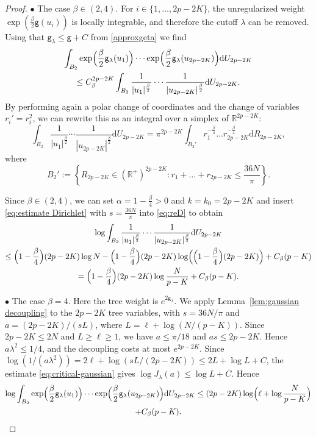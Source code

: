 \documentclass[a4paper,10pt,leqno]{amsart}
\numberwithin{equation}{section}
\newcommand{\R}{\mathbb{R}}
\newcommand{\dd}{\mathrm{d}}
\def\g{\mathsf{g}}
\begin{document}
\begin{proof}
  $\bullet$ The case $\beta\in (2,4)$. For $i\in \{1,\ldots,2p-2K\}$, the unregularized weight $\exp(\frac{\beta}{2}\g(u_i))$ is locally integrable, and therefore the cutoff $\lambda$ can be removed. Using that $\g_\lambda\leq \g+C$ from \eqref{approxgeta} we find
  \begin{multline*}
    \int_{B_2}\exp\Bigl(\frac{\beta}{2}\g_\lambda(u_1)\Bigr)\cdots \exp\Bigl(\frac{\beta}{2}\g_\lambda(u_{2p-2K})\Bigr)\dd U_{2p-2K}\\ \leq C_\beta^{2p-2K}\int_{B_2}\frac{1}{|u_1|^{\frac{\beta}{2}}}\cdots \frac{1}{|u_{2p-2K}|^{\frac{\beta}{2}}}\dd U_{2p-2K}.
  \end{multline*}
  By performing again a polar change of coordinates and the change of variables $r_i'= r_i^2$, we can rewrite this as an integral over a simplex of $\R^{2p-2K}$:
  \begin{equation}\label{eq:reD}
    \int_{B_2}\frac{1}{|u_1|^{\frac{\beta}{2}} }\cdots \frac{1}{|u_{2p-2K}|^{\frac{\beta}{2} } }\dd U_{2p-2K}=\pi^{2p-2K} \int_{B_2'}{r_1^{-\frac{\beta}{4}}}\ldots{r_{2p-2K}^{-\frac{\beta}{4}} }\dd R_{2p-2K},
  \end{equation}
  where
  \begin{equation*}
    B_2':=\left\{R_{2p-2K}\in (\R^{+})^{2p-2K}: r_1+\ldots+r_{2p-2K}\leq \frac{36 N}{\pi}\right\}.
  \end{equation*}

  Since $\beta\in (2,4)$, we can set $\alpha=1-\frac{\beta}{4}>0$ and $k=k_0=2p-2K$ and insert \eqref{eq:estimate Dirichlet} with $ s= \frac{36 N}{\pi}$ into \eqref{eq:reD} to obtain
  \begin{multline}\label{eq:bound dir}
    \log \int_{B_2}
    \frac{1}{|u_1|^{\frac{\beta}{2}} }\cdots \frac{1}{|u_{2p-2K}|^{\frac{\beta}{2} } }\dd U_{2p-2K}
    \\\leq \Bigl(1-\frac{\beta}{4}\Bigr) (2p-2K) \log N -\Bigl(1-\frac{\beta}{4}\Bigr) (2p- 2K)\log\Bigl(\Bigl(1-\frac\beta4\Bigr) (2p-2K)\Bigr)+C_\beta(p-K)\\
    = \Bigl( 1-\frac\beta4\Bigr)(2p-2K)\log \frac{N}{p-K}+C_\beta(p-K).
  \end{multline}

  $\bullet$ The case $\beta=4$. Here the tree weight is $e^{2\g_\lambda}$. We apply Lemma~\ref{lem:gaussian decoupling} to the $2p-2K$ tree variables, with $s=36N/\pi$ and $a=(2p-2K)/(sL)$, where $L=\ell+\log(N/(p-K))$. Since $2p-2K\le2N$ and $L\ge\ell\ge1$, we have $a\le\pi/18$ and $as\le2p-2K$. Hence $a\lambda^2\le1/4$, and the decoupling costs at most $e^{2p-2K}$. Since $\log(1/(a\lambda^2))=2\ell+\log(sL/(2p-2K))\le2L+\log L+C$, the estimate \eqref{eq:critical-gaussian} gives $\log J_\lambda(a)\le\log L+C$. Hence
  \begin{multline*}
    \log \int_{B_2}\exp\Bigl(\frac{\beta}{2}\g_\lambda(u_1)\Bigr)\cdots \exp\Bigl(\frac{\beta}{2}\g_\lambda(u_{2p-2K})\Bigr)\dd U_{2p-2K}\leq (2p-2K)\log\Bigl(\ell+\log \frac{N}{p-K}\Bigr)
    \\+C_\beta(p-K).
  \end{multline*}


\end{proof}
\end{document}
